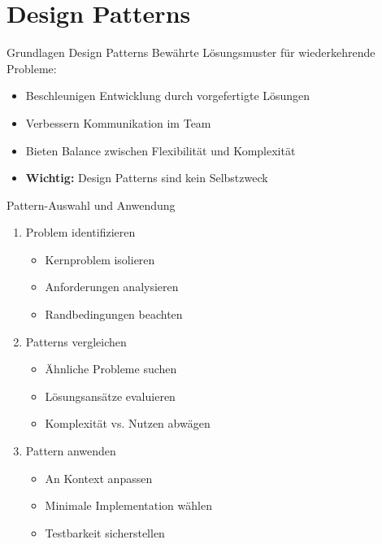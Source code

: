 \section{Design Patterns}

\begin{concept}{Grundlagen Design Patterns}
Bewährte Lösungsmuster für wiederkehrende Probleme:
\begin{itemize}
    \item Beschleunigen Entwicklung durch vorgefertigte Lösungen
    \item Verbessern Kommunikation im Team
    \item Bieten Balance zwischen Flexibilität und Komplexität
    \item \textbf{Wichtig:} Design Patterns sind kein Selbstzweck
\end{itemize}
\end{concept}

\begin{KR}{Pattern-Auswahl und Anwendung}
\begin{enumerate}
    \item Problem identifizieren
    \begin{itemize}
        \item Kernproblem isolieren
        \item Anforderungen analysieren
        \item Randbedingungen beachten
    \end{itemize}
    
    \item Patterns vergleichen
    \begin{itemize}
        \item Ähnliche Probleme suchen
        \item Lösungsansätze evaluieren
        \item Komplexität vs. Nutzen abwägen
    \end{itemize}
    
    \item Pattern anwenden
    \begin{itemize}
        \item An Kontext anpassen
        \item Minimale Implementation wählen
        \item Testbarkeit sicherstellen
    \end{itemize}
\end{enumerate}
\end{KR}

